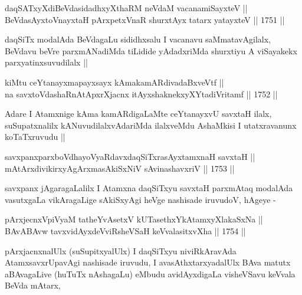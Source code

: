\begin{shl}
daqSATxyXdiBeVdasidadhxyXthaRM neVdaM vacanamiSayxteV ||  \\
BeVdasAyxtoV\s nayxtaH pArxpetxVnaR shurxtAyx tatarx yatayxteV ||  1751 ||  
\end{shl}

\begin{artha}
daqSiTx modalAda BeVdagaLu sididhxsalu I vacanavu saMmatavAgilalx,
BeVdavu beVre parxmANadiMda tiLidide yAdadxriMda shurxtiyu A
viSayakekx parxyatinxsuvudilalx ||
\end{artha}

\begin{shl}
kiMtu ceYtanayxmapayxsayx kAmakamARdivadaBxveVtf || \\
na savxtoV\s dashaRnAtApxrXjacnx itAyxshaknekxyXYtadiVritamf ||  1752 ||  
\end{shl}

\begin{artha}
Adare I Atamxnige kAma kamARdigaLaMte ceYtanayxvU savxtaH ilalx,
suSupatxnalilx kANuvudilalxvAdariMda ilalxveMdu AshaMkisi I
utatxravanunx koTaTxruvudu ||
\end{artha}


\begin{shl}
savxpanxparxboVdhayoVyaRdavxdaqSiTxrasAyx\s \s tamxnaH savxtaH || \\
mAtArxdivikirxyAgArxmasAkiSxNiV sA\s vinashavxriV ||  1753 ||  
\end{shl}

\begin{artha}
savxpanx jAgaragaLalilx I Atamxna daqSiTxyu savxtaH parxmAtaq modalAda
vasutxgaLa vikAragaLige sAkiSxyAgi heVge nashisade iruvudoV, hAgeye -
\end{artha}

\begin{shl}
pArxjecnxV\s piVyaM tatheYvA\s \s setxV kUTasethxYkAtamxyXlakaSxNa ||  \\
BAvABAvw tavxvidAyxdeVviRsheVSaH keVvalasitxvXha ||  1754 ||  
\end{shl}

\begin{artha}
pArxjacnxnalUlx (suSupitxyalUlx) I daqSiTxyu niviRkAravAda
AtamxsavxrUpavAgi nashisade iruvudu, I avasAthxtarxyadalUlx BAva
matutx aBAvagaLive (huTuTx nAshagaLu) eMbudu avidAyxdigaLa visheVSavu
keVvala BeVda mAtarx,
\end{artha}

